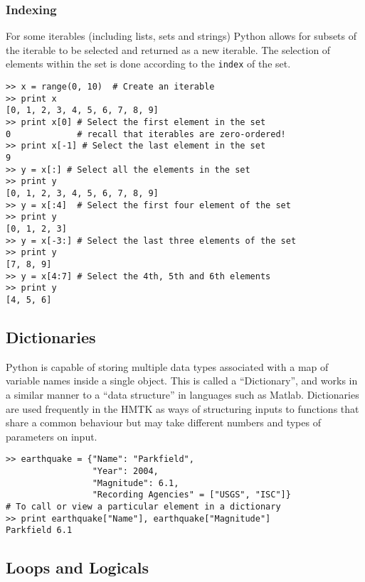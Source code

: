 \subsubsection{Indexing}

For some iterables (including lists, sets and strings) Python allows for subsets of the iterable to be selected and returned as a new iterable. The selection of elements within the set is done according to the \verb=index= of the set. 

\begin{lstlisting}[frame=single]
>> x = range(0, 10)  # Create an iterable
>> print x
[0, 1, 2, 3, 4, 5, 6, 7, 8, 9]
>> print x[0] # Select the first element in the set
0             # recall that iterables are zero-ordered!
>> print x[-1] # Select the last element in the set
9
>> y = x[:] # Select all the elements in the set
>> print y
[0, 1, 2, 3, 4, 5, 6, 7, 8, 9]
>> y = x[:4]  # Select the first four element of the set
>> print y
[0, 1, 2, 3]
>> y = x[-3:] # Select the last three elements of the set
>> print y
[7, 8, 9]
>> y = x[4:7] # Select the 4th, 5th and 6th elements
>> print y
[4, 5, 6]
\end{lstlisting}

\subsection{Dictionaries}

Python is capable of storing multiple data types associated with a map of variable names inside a single object. This is called a ``Dictionary'', and works in a similar manner to a ``data structure'' in languages such as Matlab. Dictionaries are used frequently in the HMTK as ways of structuring inputs to functions that share a common behaviour but may take different numbers and types of parameters on input.

\begin{lstlisting}[frame=single]
>> earthquake = {"Name": "Parkfield",
                 "Year": 2004,
                 "Magnitude": 6.1,
                 "Recording Agencies" = ["USGS", "ISC"]}
# To call or view a particular element in a dictionary
>> print earthquake["Name"], earthquake["Magnitude"]
Parkfield 6.1
\end{lstlisting}

\subsection{Loops and Logicals}

